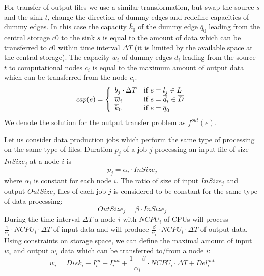 For transfer of output files we use a similar transformation, but swap the source $s$ and the sink $t$, change the direction of dummy edges and redefine capacities of dummy edges. In this case the capacity $\overline{k}_{0}$ of the dummy edge $\overline{q}_{0}$ leading from the central storage $c0$ to the sink $s$ is equal to the amount of data which can be transferred to $c0$ within time interval $\Delta T$ (it is limited by the available space at the central storage). The capacity $\overline{w}_{i}$ of dummy edges $\overline{d}_{i}$ leading from the source $t$ to computational nodes $c_{i}$ is equal to the maximum amount of output data which can be transferred from the node $c_{i}$.
\begin{equation}
\label{edge_cap_out}
cap(e) = \left\{ 
  \begin{array}{l l}
    b_{j} \cdot \Delta T & \text{if }e = l_{j} \in L \\
    \overline{w}_{i} & \text{if } e = \overline{d}_{i} \in \overline{D}\\
    \overline{k}_{0} & \text{if } e = \overline{q}_{0}
  \end{array} \right.
\end{equation}
We denote the solution for the output transfer problem as $f^{out}(e)$.

Let us consider data production jobs which perform the same type of processing on the same type of files. Duration $p_{j}$ of a job $j$  processing an input file of size $InSize_{j}$ at a node $i$ is
\begin{equation}
\label{alpha}
p_{j} = \alpha_{i} \cdot InSize_{j} 
\end{equation}
where $\alpha_{i}$ is constant for each node $i$.
The ratio of size of input $InSize_{j}$ and output $OutSize_{j}$ files of each job $j$ is considered to be constant for the same type of data processing:
\begin{equation}
\label{beta}
OutSize_{j} = \beta \cdot InSize_{j} 
\end{equation}
During the time interval $\Delta T$ a node $i$ with $NCPU_{i}$  of CPUs  will process $\frac{1}{\alpha_{i}} \cdot NCPU_{i} \cdot \Delta T$ of input data and will produce $\frac{\beta}{\alpha_{i}} \cdot NCPU_{i} \cdot \Delta T$ of output data.
Using constraints on storage space, we can define the maximal amount of input $w_{i}$ and output $\overline{w}_{i}$ data which can be transferred to/from a node $i$:
\begin{equation}
w_{i} =
Disk_{i} - I_{i}^{in} - I_{i}^{out} + \frac{1 - \beta}{\alpha_{i}} \cdot NCPU_{i} \cdot \Delta T + Del_{i}^{out}
\label{w}
\end{equation}

